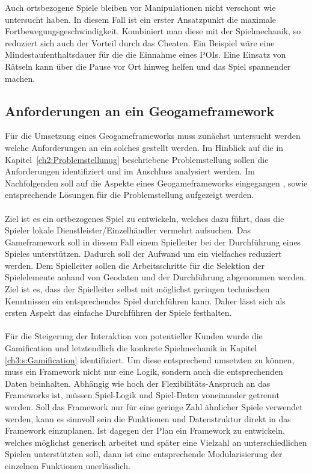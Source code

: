 Auch ortsbezogene Spiele bleiben vor Manipulationen nicht verschont wie \textcite{He.2011} untersucht haben.
In diesem Fall ist ein erster Ansatzpunkt die maximale Fortbewegungsgeschwindigkeit. Kombiniert man diese mit der Spielmechanik, so reduziert sich auch der \glqq Vorteil\grqq{} durch das Cheaten. Ein Beispiel wäre eine Mindestaufenthaltsdauer für die die Einnahme eines POIs.
Eine Einsatz von Rätseln kann über die Pause vor Ort hinweg helfen und das Spiel spannender machen.

%
\subsection*{Anforderungen an ein Geogameframework}

Für die Umsetzung eines Geogameframeworks muss zunächst untersucht werden welche Anforderungen an ein solches gestellt werden.
Im Hinblick auf die in Kapitel~\ref{ch2:Problemstellunug} beschriebene Problemstellung sollen die Anforderungen  identifiziert und im Anschluss analysiert werden. Im Nachfolgenden soll auf die Aspekte eines Geogameframeworks eingegangen , sowie entsprechende Lösungen für die Problemstellung aufgezeigt werden.
\\\\
Ziel ist es ein ortbezogenes Spiel zu entwickeln, welches dazu führt, dass die Spieler lokale Dienstleister/Einzelhändler vermehrt aufsuchen. Das Gameframework soll in diesem Fall einem Spielleiter bei der Durchführung eines Spieles unterstützen. Dadurch soll der Aufwand um ein vielfaches reduziert werden.
Dem Spielleiter sollen die Arbeitsschritte für die Selektion der Spielelemente anhand von Geodaten und der Durchführung abgenommen werden. Ziel ist es, dass der Spielleiter selbst mit möglichst geringen technischen Kenntnissen ein entsprechendes Spiel durchführen kann. Daher lässt sich als ersten Aspekt das einfache Durchführen der Spiele festhalten.
\\\\
Für die Steigerung der Interaktion von potentieller Kunden wurde die Gamification und letztendlich die konkrete Spielmechanik in Kapitel \ref{ch3:s:Gamification} identifiziert. Um diese entsprechend umsetzten zu können, muss ein Framework nicht nur eine Logik, sondern auch die entsprechenden Daten beinhalten. Abhängig wie hoch der Flexibilitäts-Anspruch an das Frameworks ist, müssen Spiel-Logik und Spiel-Daten voneinander getrennt werden. Soll das Framework nur für eine geringe Zahl ähnlicher Spiele verwendet werden, kann es sinnvoll sein die Funktionen und Datenstruktur direkt in das Framework einzuplanen. Ist dagegen der Plan ein Framework zu entwickeln, welches möglichst generisch arbeitet und später eine Vielzahl an unterschiedlichen Spielen unterstützten soll, dann ist eine entsprechende Modularisierung der einzelnen Funktionen unerlässlich.
